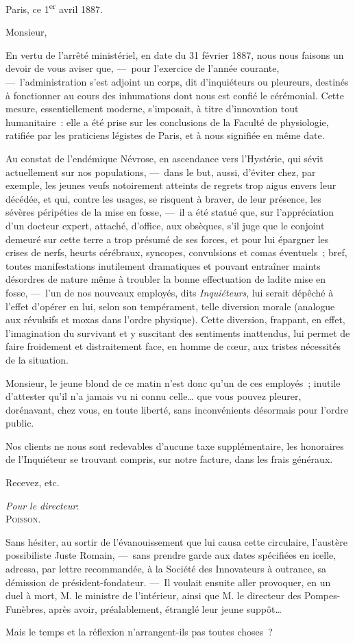 \documentclass[french,twoside]{book} %
\begin{document}
\noindent Paris, ce 1\textsuperscript{er} avril 1887.\par
Monsieur,\par
En vertu de l’arrêté ministériel, en date du 31 février 1887, nous nous faisons un devoir de vous aviser que, — pour l’exercice de l’année courante, — l’administration s’est adjoint un corps, dit d’inquiéteurs ou pleureurs, destinés à fonctionner au cours des inhumations dont nous est confié le cérémonial. Cette mesure, essentiellement moderne, s’imposait, à titre d’innovation tout humanitaire : elle a été prise sur les conclusions de la   Faculté de physiologie, ratifiée par les praticiens légistes de Paris, et à nous signifiée en même date.\par
Au constat de l’endémique Névrose, en ascendance vers l’Hystérie, qui sévit actuellement sur nos populations, — dans le but, aussi, d’éviter chez, par exemple, les jeunes veufs notoirement atteints de regrets trop aigus envers leur décédée, et qui, contre les usages, se risquent à braver, de leur présence, les sévères péripéties de la mise en fosse, — il a été statué que, sur l’appréciation d’un docteur expert, attaché, d’office, aux obsèques, s’il juge que le conjoint demeuré sur cette terre a trop présumé de ses forces, et pour lui épargner les crises de nerfs, heurts cérébraux, syncopes, convulsions et comas éventuels ; bref, toutes manifestations inutilement dramatiques et pouvant entraîner maints désordres de nature même à troubler la bonne effectuation de ladite mise en fosse, — l’un de nos nouveaux employés, dits \emph{Inquiéteurs}, lui serait dépêché à l’effet d’opérer en lui, selon son tempérament, telle diversion morale (analogue aux révulsifs et moxas dans l’ordre physique). Cette diversion, frappant, en effet, l’imagination du survivant et y suscitant des sentiments inattendus, lui permet de faire froidement et distraitement face, en homme de cœur, aux tristes nécessités de la situation.\par
Monsieur, le jeune blond de ce matin n’est donc qu’un de ces employés ; inutile d’attester qu’il n’a jamais vu ni connu celle… que vous pouvez pleurer, dorénavant, chez vous, en toute liberté, sans inconvénients désormais pour l’ordre public.\par
Nos clients ne nous sont redevables d’aucune taxe   supplémentaire, les honoraires de l’Inquiéteur se trouvant compris, sur notre facture, dans les frais généraux.\par
Recevez, etc.\par
\emph{Pour le directeur}: \\
{\scshape Poisson}.\par
Sans hésiter, au sortir de l’évanouissement que lui causa cette circulaire, l’austère possibiliste Juste Romain, — sans prendre garde aux dates spécifiées en icelle, adressa, par lettre recommandée, à la Société des Innovateurs à outrance, sa démission de président-fondateur. — Il voulait ensuite aller provoquer, en un duel à mort, M. le ministre de l’intérieur, ainsi que M. le directeur des Pompes-Funèbres, après avoir, préalablement, étranglé leur jeune suppôt…\par
Mais le temps et la réflexion n’arrangent-ils pas toutes choses ?
\end{document}
